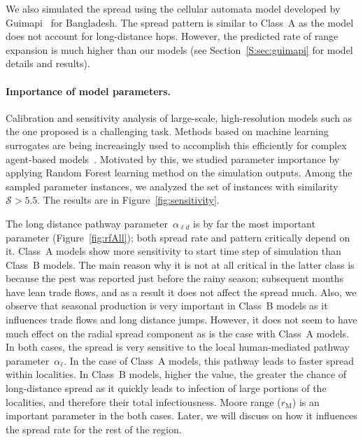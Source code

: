 \documentclass[11pt]{article}
\newcommand{\similarity}{\mathcal{S}}
\newcommand{\afm}{\alpha_{\ell}}
\newcommand{\ald}{\alpha_{\ell d}}
\newcommand{\mooreRange}{r_\mathrm{M}}
\theoremstyle{definition}
\begin{document}
We also simulated the spread using the cellular automata model developed by
Guimapi~\cite{guimapi2016modeling} for Bangladesh. The spread pattern is
similar to Class~A as the model does not account for long-distance
hops. However, the predicted rate of range expansion is much higher than
our models (see Section~\ref{S:sec:guimapi} for model details and results).


\paragraph{Importance of model parameters.} 
Calibration and sensitivity analysis of large-scale, high-resolution models such as
the one proposed is a challenging task. Methods based on machine learning
surrogates are being increasingly used to accomplish this efficiently for
complex agent-based models~\cite{lamperti2018agent}. Motivated by this, we
studied parameter importance by applying Random Forest learning method on
the simulation outputs. Among the sampled parameter instances, we analyzed
the set of instances with similarity~$\similarity>5.5$. The results are in
Figure~\ref{fig:sensitivity}. 

The long distance pathway parameter~$\ald$ is by far the most important
parameter (Figure~\ref{fig:rfAll}); both spread rate and pattern critically
depend on it. Class~A models show more sensitivity to start time step of
simulation than Class~B models. The main reason why it is not at all
critical in the latter class is because the pest was reported just before
the rainy season; subsequent months have lean trade flows, and as a result
it does not affect the spread much. Also, we observe that seasonal
production is very important in Class~B models as it influences trade flows
and long distance jumps. However, it does not seem to have much effect on
the radial spread component as is the case with Class~A models. In both
cases, the spread is very sensitive to the local human-mediated pathway
parameter~$\afm$. In the case of Class~A models, this pathway leads to
faster spread within localities. In Class~B models, higher the value, the
greater the chance of long-distance spread as it quickly leads to infection
of large portions of the localities, and therefore their total
infectiousness. Moore range ($\mooreRange$) is an important parameter in
the both cases. Later, we will discuss on how it influences the spread rate
for the rest of the region.
\end{document}
